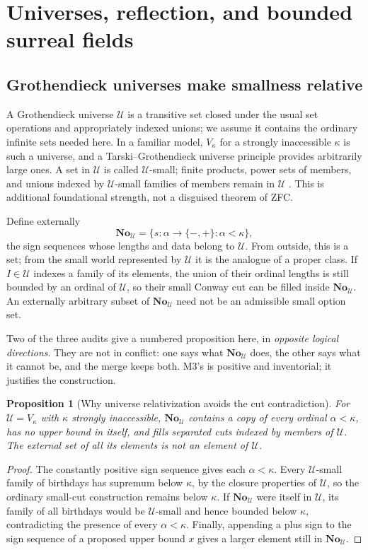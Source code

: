 \documentclass[11pt,letterpaper]{article}
\numberwithin{equation}{section}
\newtheorem{proposition}[theorem]{Proposition}
\theoremstyle{definition}
\theoremstyle{remark}
\newcommand{\No}{\mathbf{No}}
\newcommand{\U}{\mathcal U}
\begin{document}
\section{Universes, reflection, and bounded surreal fields}
\label{found:sec:universes}

\subsection{Grothendieck universes make smallness relative}
\label{found:sub:universes}
A Grothendieck universe $\U$ is a transitive set closed under the usual set
operations and appropriately indexed unions; we assume it contains the ordinary
infinite sets needed here. In a familiar model, $V_\kappa$ for a strongly
inaccessible $\kappa$ is such a universe, and a Tarski--Grothendieck universe
principle provides arbitrarily large ones. A set in $\U$ is called
$\U$-small; finite products, power sets of members, and unions indexed by
$\U$-small families of members remain in $\U$ \cite[\S8]{found:ShulmanSize}.
This is additional foundational strength, not a disguised theorem of ZFC.

Define externally
\begin{equation}\label{found:eq:NoU}
 \No_\U=\{s:\alpha\to\{-,+\}:\alpha<\kappa\},
\end{equation}
the sign sequences whose lengths and data belong to $\U$. From outside, this is
a set; from the small world represented by $\U$ it is the analogue of a proper
class. If $I\in\U$ indexes a family of its elements, the union of their ordinal
lengths is still bounded by an ordinal of $\U$, so their small Conway cut can be
filled inside $\No_\U$. An externally arbitrary subset of $\No_\U$ need not be
an admissible small option set.

Two of the three audits give a numbered proposition here, in \emph{opposite
logical directions}. They are not in conflict: one says what $\No_\U$ does, the
other says what it cannot be, and the merge keeps both. M3's is positive and
inventorial; it justifies the construction.

\begin{proposition}[Why universe relativization avoids the cut contradiction]\label{found:prop:universe}
For $\U=V_\kappa$ with $\kappa$ strongly inaccessible, $\No_\U$ contains a copy
of every ordinal $\alpha<\kappa$, has no upper bound in itself, and fills
separated cuts indexed by members of $\U$. The external set of all its elements
is not an element of $\U$.
\end{proposition}
\begin{proof}
The constantly positive sign sequence gives each $\alpha<\kappa$. Every
$\U$-small family of birthdays has supremum below $\kappa$, by the closure
properties of $\U$, so the ordinary small-cut construction remains below
$\kappa$. If $\No_\U$ were itself in $\U$, its family of all birthdays would be
$\U$-small and hence bounded below $\kappa$, contradicting the presence of
every $\alpha<\kappa$. Finally, appending a plus sign to the sign sequence of a
proposed upper bound $x$ gives a larger element still in $\No_\U$.
\end{proof}
\end{document}
